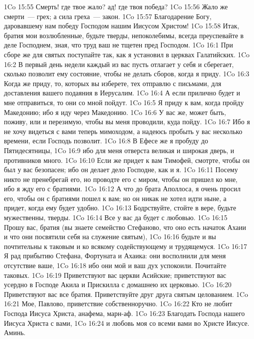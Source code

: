 \vs 1Co 15:55 Смерть! где твое жало? ад! где твоя победа?
\vs 1Co 15:56 Жало же смерти~--- грех; а сила греха~--- закон.
\vs 1Co 15:57 Благодарение Богу, даровавшему нам победу Господом нашим Иисусом Христом!
\vs 1Co 15:58 Итак, братия мои возлюбленные, будьте тверды, непоколебимы, всегда преуспевайте в деле Господнем, зная, что труд ваш не тщетен пред Господом.
\vs 1Co 16:1 При сборе же для святых поступайте так, как я установил в церквах Галатийских.
\vs 1Co 16:2 В первый день недели каждый из вас пусть отлагает у себя и сберегает, сколько позволит ему состояние, чтобы не делать сборов, когда я приду.
\vs 1Co 16:3 Когда же приду, то, которых вы изберете, тех отправлю с письмами, для доставления вашего подаяния в Иерусалим.
\vs 1Co 16:4 А если прилично будет и мне отправиться, то они со мной пойдут.
\rsbpar\vs 1Co 16:5 Я приду к вам, когда пройду Македонию; ибо я иду через Македонию.
\vs 1Co 16:6 У вас же, может быть, поживу, или и перезимую, чтобы вы меня проводили, куда пойду.
\vs 1Co 16:7 Ибо я не хочу видеться с вами теперь мимоходом, а надеюсь пробыть у вас несколько времени, если Господь позволит.
\vs 1Co 16:8 В Ефесе же я пробуду до Пятидесятницы,
\vs 1Co 16:9 ибо для меня отверста великая и широкая дверь, и противников много.
\rsbpar\vs 1Co 16:10 Если же придет к вам Тимофей, смотрте, чтобы он был у вас безопасен; ибо он делает дело Господне, как и я.
\vs 1Co 16:11 Посему никто не пренебрегай его, но проводте его с миром, чтобы он пришел ко мне, ибо я жду его с братиями.
\vs 1Co 16:12 А что до брата Аполлоса, я очень просил его, чтобы он с братиями пошел к вам; но он никак не хотел идти ныне, а придет, когда ему будет удобно.
\rsbpar\vs 1Co 16:13 Бодрствуйте, стойте в вере, будьте мужественны, тверды.
\vs 1Co 16:14 Все у вас да будет с любовью.
\rsbpar\vs 1Co 16:15 Прошу вас, братия (вы знаете семейство Стефаново, что оно есть начаток Ахаии и что они посвятили себя на служение святым),
\vs 1Co 16:16 будьте и вы почтительны к таковым и ко всякому содействующему и трудящемуся.
\vs 1Co 16:17 Я рад прибытию Стефана, Фортуната и Ахаика: они восполнили для меня отсутствие ваше,
\vs 1Co 16:18 ибо они мой и ваш дух успокоили. Почитайте таковых.
\rsbpar\vs 1Co 16:19 Приветствуют вас церкви Асийские; приветствуют вас усердно в Господе Акила и Прискилла с домашнею их церковью.
\vs 1Co 16:20 Приветствуют вас все братия. Приветствуйте друг друга святым целованием.
\rsbpar\vs 1Co 16:21 Мое, Павлово, приветствие собственноручно.
\vs 1Co 16:22 Кто не любит Господа Иисуса Христа, анафема, марн-аф.
\vs 1Co 16:23 Благодать Господа нашего Иисуса Христа с вами,
\vs 1Co 16:24 и любовь моя со всеми вами во Христе Иисусе. Аминь.
